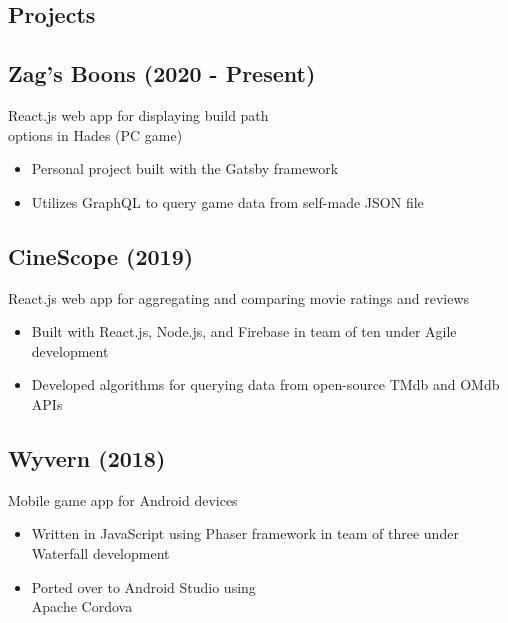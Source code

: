 \documentclass{article}
\begin{document}
\setlength{\columnsep}{1.5cm} 		%
\setlength{\columnseprule}{0.2pt} 	%
\begin{paracol}{2} 			%

\vspace{-2.5em}
\section{Projects}

\vspace{-0.5em}
\subsection{Zag's Boons (2020 - Present)} \hfill

{\color{NavyBlue} React.js web app for displaying build path 
\\\indent options in Hades (PC game)}
\begin{itemize}[leftmargin=*]
	\itemsep0em 
	\item Personal project built with the Gatsby framework
	\item Utilizes GraphQL to query game data from self-made JSON file
\end{itemize}

\vspace{-0.5em}
\subsection{CineScope (2019)} \hfill

{\color{NavyBlue} React.js web app for aggregating and comparing 
\indent movie ratings and reviews}
\begin{itemize}[leftmargin=*]
	\itemsep0em 
	\item Built with React.js, Node.js, and Firebase in team of ten under Agile development
	\item Developed algorithms for querying data from open-source TMdb and OMdb APIs
\end{itemize}

\vspace{-0.5em}
\subsection{Wyvern (2018)} \hfill

{\color{NavyBlue} Mobile game app for Android devices}
\begin{itemize}[leftmargin=*]
	\itemsep0em 
	\item Written in JavaScript using Phaser framework in team of three under Waterfall development
	\item Ported over to Android Studio using 
\\\indent Apache Cordova
\end{itemize}


\end{paracol}
\end{document}
